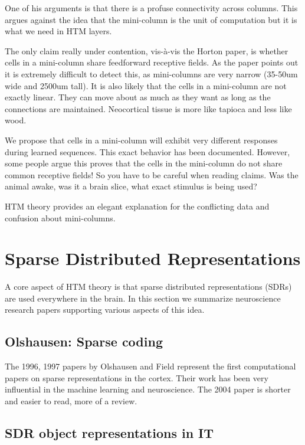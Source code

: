\documentclass{article} %
\begin{document}
One of his arguments is that there is a profuse connectivity across columns.
This argues against the idea that the mini-column is the unit of computation but
it is what we need in HTM layers.

The only claim really under contention, vis-à-vis the Horton paper, is whether
cells in a mini-column share feedforward receptive fields.  As the paper points
out it is extremely difficult to detect this, as mini-columns are very narrow
(35-50um wide and 2500um tall).  It is also likely that the cells in a
mini-column are not exactly linear.  They can move about as much as they want as
long as the connections are maintained. Neocortical tissue is more like tapioca
and less like wood.

We propose that cells in a mini-column will exhibit very different responses
during learned sequences.  This exact behavior has been documented.  However,
some people argue this proves that the cells in the mini-column do not share
common receptive fields!  So you have to be careful when reading claims.  Was
the animal awake, was it a brain slice, what exact stimulus is being used?

HTM theory provides an elegant explanation for the conflicting data and
confusion about mini-columns.

\section{Sparse Distributed Representations}

A core aspect of HTM theory is that sparse distributed representations (SDRs)
are used everywhere in the brain. In this section we summarize neuroscience
research papers supporting various aspects of this idea.

\subsection{Olshausen: Sparse coding}

The 1996, 1997 papers \cite{Olshausen1996, Olshausen1997} by Olshausen and Field
represent the first computational papers on sparse representations in the
cortex. Their work has been very influential in the machine learning and
neuroscience. The 2004 paper \cite{Olshausen2004} is shorter and easier to read,
more of a review.

\subsection{SDR object representations in IT}
\end{document}
